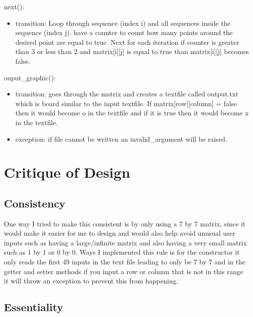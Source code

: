 \documentclass[12pt]{article}
\begin{document}
\noindent next():
\begin{itemize}
\item transition: Loop through sequence (index i) and all sequences inside the sequence (index j). have a counter to count how many points around the desired point are equal to true. Next for each iteration if counter is greater than 3 or less than 2 and matrix[i][j] is equal to true than matrix[i][j] becomes false. 
\end{itemize}

\noindent ouput\_graphic():
\begin{itemize}
\item transition: goes through the matrix and creates a textfile called output.txt which is board similar to the input textfile. If matrix[row][column] = false then it would become o in the textfile and if it is true then it would become x in the textfile.

\item exception: if file cannot be written an invalid\_argument will be raised.

\end{itemize}

\newpage

\section*{Critique of Design}

\subsection*{Consistency}

One way I tried to make this consistent is by only using a 7 by 7 matrix, since it would make it easier for me to design and would also help avoid unusual user inputs such as having a large/infinite matrix and also having a very small matrix such as 1 by 1 or 0 by 0. Ways I implemented this rule is for the constructor it only reads the first 49 inputs in the text file leading to only be 7 by 7 and in the getter and setter methods if you input a row or column that is not in this range it will throw an exception to prevent this from happening.

\subsection*{Essentiality}
\end{document}
